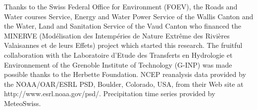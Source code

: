 \documentclass[twocol]{ametsoc}
\begin{document}
Thanks to the Swiss Federal Office for Environment (FOEV), the Roads and Water courses Service, Energy and Water Power Service of the Wallis Canton and the Water, Land and Sanitation Service of the Vaud Canton who financed the MINERVE (Mod\'{e}lisation des Intemp\'{e}ries de Nature Extr\^{e}me des Rivi\`{e}res Valaisannes et de leurs Effets) project which started this research. The fruitful collaboration with the Laboratoire d’Etude des Transferts en Hydrologie et Environnement of the Grenoble Institute of Technology (G-INP) was made possible thanks to the Herbette Foundation. NCEP reanalysis data provided by the NOAA/OAR/ESRL PSD, Boulder, Colorado, USA, from their Web site at http://www.esrl.noaa.gov/psd/. Precipitation time series provided by MeteoSwiss. 


%






%
%
%

% 

\end{document}
